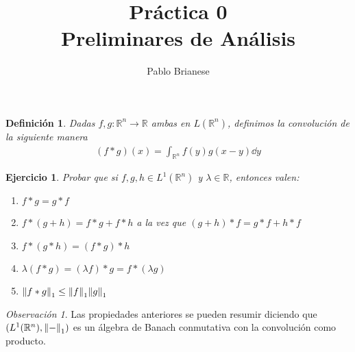 \documentclass{article}
\title{Práctica 0 \\ Preliminares de Análisis}
\author{Pablo Brianese}
\newcommand{\placeholderParameter}{-}
\newcommand{\realNumbers}{\mathbb{R}}
\newtheorem{definition}{Definición}
\newtheorem{exercise}{Ejercicio}
\theoremstyle{remark}
\newtheorem{remark}{Observación}
\begin{document}
\maketitle
  \begin{definition}
    Dadas \(f, g : \realNumbers^n \rightarrow \realNumbers\) ambas en \(L(\realNumbers^n)\), definimos la convolución de la siguiente manera
    \begin{align}
      (f * g) (x)
      =
      \int_{\realNumbers^n} f(y) g(x - y) \dd y
    \end{align}
  \end{definition}

  \begin{exercise}
    Probar que si \(f, g, h \in L^1(\realNumbers^n)\) y \(\lambda \in \realNumbers\), entonces valen:
    \begin{enumerate}
      \item 
        \label{exercise:convolutionConmutativity}
        \(f * g = g * f\)
      \item
        \label{exercise:convolutionDistributiveLaw}
        \(f * (g + h) = f * g + f * h\)
        a la vez que
        \((g + h) * f = g * f + h * f\)
      \item 
        \label{exercise:convolutionAsociativity}
        \(f * (g * h) = (f * g) * h\)
      \item 
        \label{exercise:convolutionScalarAsociativity}
        \(\lambda (f * g) 
        =
        (\lambda f) * g
        = 
        f * (\lambda g)\)
      \item
        \label{exercise:convolutionL1Bound}
        \(\norm{f * g}_1 
        \leq 
        \norm{f}_1 \norm{g}_1\)
    \end{enumerate}
  \end{exercise}

  \begin{remark}
    Las propiedades anteriores se pueden resumir diciendo que \((L^1(\realNumbers^n), \norm{\placeholderParameter}_1)\) es un álgebra de Banach conmutativa con la convolución como producto.
  \end{remark}
\end{document}
